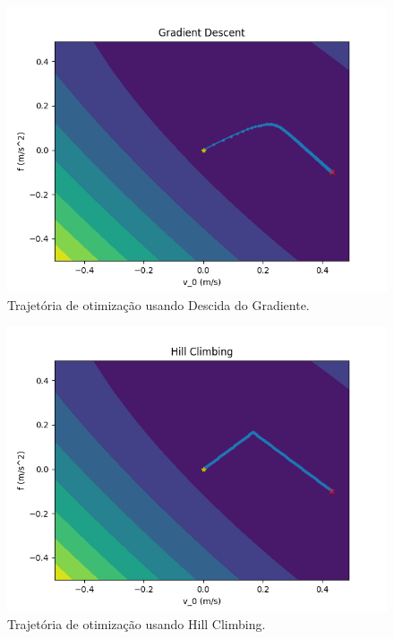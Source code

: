 \documentclass[conference]{IEEEtran}
\begin{document}
\begin{figure}[htbp]
\centering
\centerline{\includegraphics[scale=0.4]{gradient_descent.png}}
\caption{Trajetória de otimização usando Descida do Gradiente.}
\label{gradient_descent}
\end{figure}

\begin{figure}[htbp]
\centering
\centerline{\includegraphics[scale=0.4]{hill_climbing.png}}
\caption{Trajetória de otimização usando Hill Climbing.}
\label{hill_climbing}
\end{figure} 
\end{document}
